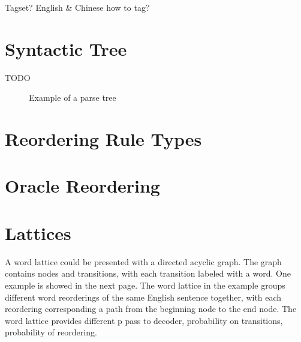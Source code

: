 Tagset? English \& Chinese how to tag?


\label{ch:Foundations:sec:PosTag}

\section{Syntactic Tree}
\label{ch:Foundations:sec:SyntacticTree}

TODO

\begin{figure}[H]
\centering

\caption{Example of a parse tree}
\end{figure}


\section{Reordering Rule Types}
\label{ch:Foundations:sec:types}

\section{Oracle Reordering}
\label{ch:Foundations:sec:oracle}



\section{Lattices}
\label{ch:Foundations:sec:Lattices}
A word lattice could be presented with a directed acyclic graph. The graph contains nodes and transitions, with each transition labeled with a word. One example is showed in the next page. The word lattice in the example groups different word reorderings of the same English sentence together, with each reordering corresponding a path from the beginning node to the end node. The word lattice provides different p 
pass to decoder,
probability on transitions,
probability of reordering.

